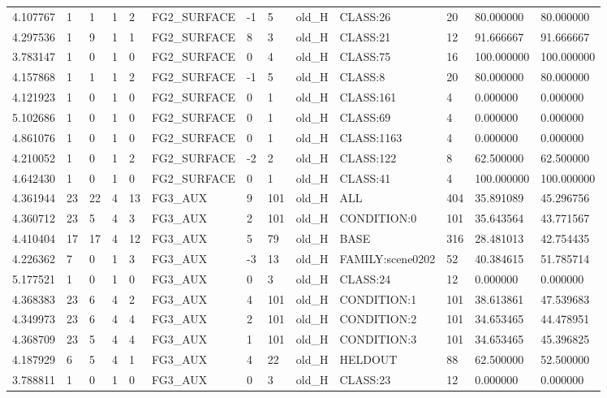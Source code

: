 \begin{tabular}{lllllllllllll}
4.107767 & 1 & 1 & 1 & 2 & FG2\_SURFACE & -1 & 5 & old\_H & CLASS:26 & 20 & 80.000000 & 80.000000 \\
4.297536 & 1 & 9 & 1 & 1 & FG2\_SURFACE & 8 & 3 & old\_H & CLASS:21 & 12 & 91.666667 & 91.666667 \\
3.783147 & 1 & 0 & 1 & 0 & FG2\_SURFACE & 0 & 4 & old\_H & CLASS:75 & 16 & 100.000000 & 100.000000 \\
4.157868 & 1 & 1 & 1 & 2 & FG2\_SURFACE & -1 & 5 & old\_H & CLASS:8 & 20 & 80.000000 & 80.000000 \\
4.121923 & 1 & 0 & 1 & 0 & FG2\_SURFACE & 0 & 1 & old\_H & CLASS:161 & 4 & 0.000000 & 0.000000 \\
5.102686 & 1 & 0 & 1 & 0 & FG2\_SURFACE & 0 & 1 & old\_H & CLASS:69 & 4 & 0.000000 & 0.000000 \\
4.861076 & 1 & 0 & 1 & 0 & FG2\_SURFACE & 0 & 1 & old\_H & CLASS:1163 & 4 & 0.000000 & 0.000000 \\
4.210052 & 1 & 0 & 1 & 2 & FG2\_SURFACE & -2 & 2 & old\_H & CLASS:122 & 8 & 62.500000 & 62.500000 \\
4.642430 & 1 & 0 & 1 & 0 & FG2\_SURFACE & 0 & 1 & old\_H & CLASS:41 & 4 & 100.000000 & 100.000000 \\
4.361944 & 23 & 22 & 4 & 13 & FG3\_AUX & 9 & 101 & old\_H & ALL & 404 & 35.891089 & 45.296756 \\
4.360712 & 23 & 5 & 4 & 3 & FG3\_AUX & 2 & 101 & old\_H & CONDITION:0 & 101 & 35.643564 & 43.771567 \\
4.410404 & 17 & 17 & 4 & 12 & FG3\_AUX & 5 & 79 & old\_H & BASE & 316 & 28.481013 & 42.754435 \\
4.226362 & 7 & 0 & 1 & 3 & FG3\_AUX & -3 & 13 & old\_H & FAMILY:scene0202 & 52 & 40.384615 & 51.785714 \\
5.177521 & 1 & 0 & 1 & 0 & FG3\_AUX & 0 & 3 & old\_H & CLASS:24 & 12 & 0.000000 & 0.000000 \\
4.368383 & 23 & 6 & 4 & 2 & FG3\_AUX & 4 & 101 & old\_H & CONDITION:1 & 101 & 38.613861 & 47.539683 \\
4.349973 & 23 & 6 & 4 & 4 & FG3\_AUX & 2 & 101 & old\_H & CONDITION:2 & 101 & 34.653465 & 44.478951 \\
4.368709 & 23 & 5 & 4 & 4 & FG3\_AUX & 1 & 101 & old\_H & CONDITION:3 & 101 & 34.653465 & 45.396825 \\
4.187929 & 6 & 5 & 4 & 1 & FG3\_AUX & 4 & 22 & old\_H & HELDOUT & 88 & 62.500000 & 52.500000 \\
3.788811 & 1 & 0 & 1 & 0 & FG3\_AUX & 0 & 3 & old\_H & CLASS:23 & 12 & 0.000000 & 0.000000 \\

\end{tabular}
